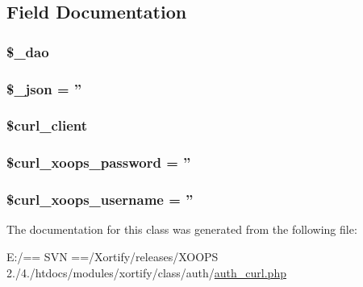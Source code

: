 \subsection{Field Documentation}
\hypertarget{class_xortify_auth_curl_a12a029c610f699b4b25e79a1f64a3485}{
\subsubsection[{\$\-\_\-dao}]{\setlength{\rightskip}{0pt plus 5cm}\$\-\_\-dao}}\label{class_xortify_auth_curl_a12a029c610f699b4b25e79a1f64a3485}
\hypertarget{class_xortify_auth_curl_a94787b37d92a2dee02534eed4f316589}{
\subsubsection[{\$\-\_\-json}]{\setlength{\rightskip}{0pt plus 5cm}\$\-\_\-json = ''}}\label{class_xortify_auth_curl_a94787b37d92a2dee02534eed4f316589}
\hypertarget{class_xortify_auth_curl_a402f2112991f3227835af80e9df33e38}{
\subsubsection[{\$curl\-\_\-client}]{\setlength{\rightskip}{0pt plus 5cm}\$curl\-\_\-client}}\label{class_xortify_auth_curl_a402f2112991f3227835af80e9df33e38}
\hypertarget{class_xortify_auth_curl_a6c9851541ed3826c67cfe7224c38f0b8}{
\subsubsection[{\$curl\-\_\-xoops\-\_\-password}]{\setlength{\rightskip}{0pt plus 5cm}\$curl\-\_\-xoops\-\_\-password = ''}}\label{class_xortify_auth_curl_a6c9851541ed3826c67cfe7224c38f0b8}
\hypertarget{class_xortify_auth_curl_aab7480ba9f878a02b2c9fd43922fa070}{
\subsubsection[{\$curl\-\_\-xoops\-\_\-username}]{\setlength{\rightskip}{0pt plus 5cm}\$curl\-\_\-xoops\-\_\-username = ''}}\label{class_xortify_auth_curl_aab7480ba9f878a02b2c9fd43922fa070}


The documentation for this class was generated from the following file\-:\begin{DoxyCompactItemize}
\item 
E\-:/== S\-V\-N ==/\-Xortify/releases/\-X\-O\-O\-P\-S 2./4./htdocs/modules/xortify/class/auth/\hyperlink{auth__curl_8php}{auth\-\_\-curl.\-php}\end{DoxyCompactItemize}
